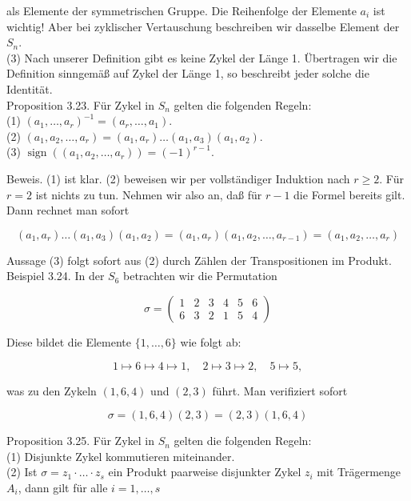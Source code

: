 \documentclass[10pt, letterpaper]{article}
\begin{document}
als Elemente der symmetrischen Gruppe. Die Reihenfolge der Elemente $a_{i}$ ist wichtig! Aber bei zyklischer Vertauschung beschreiben wir dasselbe Element der $S_{n}$.\\
(3) Nach unserer Definition gibt es keine Zykel der Länge 1. Übertragen wir die Definition sinngemäß auf Zykel der Länge 1, so beschreibt jeder solche die Identität.\\
Proposition 3.23. Für Zykel in $S_{n}$ gelten die folgenden Regeln:\\
(1) $\left(a_{1}, \ldots, a_{r}\right)^{-1}=\left(a_{r}, \ldots, a_{1}\right)$.\\
(2) $\left(a_{1}, a_{2}, \ldots, a_{r}\right)=\left(a_{1}, a_{r}\right) \ldots\left(a_{1}, a_{3}\right)\left(a_{1}, a_{2}\right)$.\\
(3) $\operatorname{sign}\left(\left(a_{1}, a_{2}, \ldots, a_{r}\right)\right)=(-1)^{r-1}$.

Beweis. (1) ist klar. (2) beweisen wir per vollständiger Induktion nach $r \geq 2$. Für $r=2$ ist nichts zu tun. Nehmen wir also an, daß für $r-1$ die Formel bereits gilt. Dann rechnet man sofort

$$
\left(a_{1}, a_{r}\right) \ldots\left(a_{1}, a_{3}\right)\left(a_{1}, a_{2}\right)=\left(a_{1}, a_{r}\right)\left(a_{1}, a_{2}, \ldots, a_{r-1}\right)=\left(a_{1}, a_{2}, \ldots, a_{r}\right)
$$

Aussage (3) folgt sofort aus (2) durch Zählen der Transpositionen im Produkt.\\
Beispiel 3.24. In der $S_{6}$ betrachten wir die Permutation

$$
\sigma=\left(\begin{array}{cccccc}
1 & 2 & 3 & 4 & 5 & 6 \\
6 & 3 & 2 & 1 & 5 & 4
\end{array}\right)
$$

Diese bildet die Elemente $\{1, \ldots, 6\}$ wie folgt ab:

$$
1 \mapsto 6 \mapsto 4 \mapsto 1, \quad 2 \mapsto 3 \mapsto 2, \quad 5 \mapsto 5,
$$

was zu den Zykeln $(1,6,4)$ und $(2,3)$ führt. Man verifiziert sofort

$$
\sigma=(1,6,4)(2,3)=(2,3)(1,6,4)
$$

Proposition 3.25. Für Zykel in $S_{n}$ gelten die folgenden Regeln:\\
(1) Disjunkte Zykel kommutieren miteinander.\\
(2) Ist $\sigma=z_{1} \cdot \ldots \cdot z_{s}$ ein Produkt paarweise disjunkter Zykel $z_{i}$ mit Trägermenge $A_{i}$, dann gilt für alle $i=1, \ldots, s$
\end{document}
